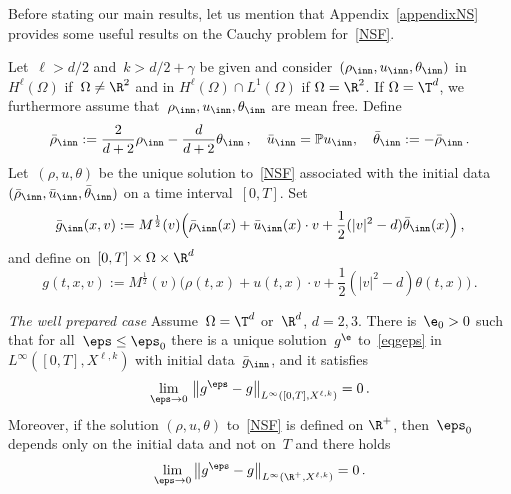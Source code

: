 Before stating our main results, let us mention that Appendix~\ref{appendixNS} provides some useful results on the Cauchy problem for~\eqref{NSF}.
\begin{theo}\label{mainthmwp}
Let~$\ell>d/2$ and~{$k>d/2 +\gamma$} be given and consider~$(\rho_{\inn},u_{\inn},\theta_{\inn})$ in~$ H^\ell (\Omega)$ {if~$\Omega \neq \R^2$ and in $ H^\ell (\Omega) \cap L^1(\Omega)$ if $\Omega = \R^2$}. If $\Omega= \T^d$, we furthermore assume that~$\rho_{\inn},u_{\inn},\theta_{\inn}$ are mean free. Define
\begin{equation}\label{relationbarnotbar}
\bar \rho_{\inn}:= \frac2{d+2} \rho_{\inn}- \frac{d}{d+2} \theta_{\inn} \,, \quad \bar u_{\inn} = \mathbb{P} u_{\inn}, \quad \bar \theta_{\inn} := - \bar \rho_{\inn} \,.
\end{equation}
Let~$(\rho,u,\theta)$ be the unique solution to~\eqref{NSF} associated with the initial data~$(\bar \rho_{\inn},\bar u_{\inn},\bar \theta_{\inn})$ on a time interval~$[0,T]$. Set
\begin{equation}\label{defg0dataperiodi}
\bar g_{\inn}(x,v):=M^\frac12(v)\Big(\bar \rho_{\inn} (x) + \bar u_{\inn}(x) \cdot v + \frac12(|v|^2- d) \bar \theta_{\inn} (x)\Big)\,,
\end{equation}
and define on~$[0,T] \times \Omega \times \R^d$
\begin{equation}\label{defg0solution}
g (t,x,v) := M^\frac12(v)\Big(\rho (t,x) + u (t,x) \cdot v + \frac12(|v|^2- d) \theta(t,x) \Big)\,.
\end{equation}

\smallskip
\emph{The well prepared case}\pointir
Assume~$\Omega = \T^d$ or~$\R^d$, $d= 2,3$. There is~$\e_0>0$ such that for all~$\eps \le \eps_0$ there is a unique solution~$g^\e$ to~\eqref{eqgeps} in~$L^\infty([0,T],X^{\ell,k})$ with initial data~$\bar g_{\inn}$, and it satisfies
\begin{equation}\label{limgepsg0wp}
\lim_{\eps\to 0} \, \big\| g^\eps-g
\big\|_{L^\infty([0,T],X^{\ell,k})} = 0 \,.
\end{equation}
Moreover, if the solution $(\rho,u,\theta)$ to~\eqref{NSF} is defined on $\R^+$, then~$\eps_0$ depends only on the initial data and not on~$T$ and there holds
\[
\lim_{\eps\to 0} \big\| g^\eps-g \big\|_{L^\infty(\R^+,X^{\ell,k})} = 0 \,.
\]


\end{theo}

